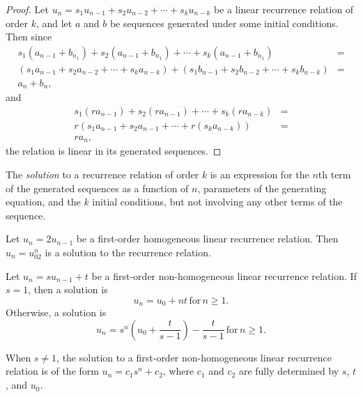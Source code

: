 \begin{proof}
    Let $u_n = s_1u_{n-1} + s_2u_{n-2} + \cdots + s_ku_{n-k}$ be a linear recurrence relation of order $k$, and let $a$ and $b$ be sequences generated under some initial conditions. Then since
    \begin{align*}
        s_1(a_{n-1} + b_{n_1}) + s_2(a_{n-1} + b_{n_1}) + \cdots + s_k(a_{n-1} + b_{n_1}) & = \\ (s_1a_{n-1} + s_2a_{n-2} + \cdots + s_ka_{n-k}) + (s_1b_{n-1} + s_2b_{n-2} + \cdots + s_kb_{n-k}) & = \\
        a_n + b_n, &
    \end{align*}
    and
    \begin{align*}
        s_1(ra_{n-1}) + s_2(ra_{n-1}) + \cdots + s_k(ra_{n-k}) & = \\
        r(s_1a_{n-1} + s_2a_{n-1} + \cdots + r(s_ka_{n-k})) & = \\
        ra_n, &
    \end{align*}
    the relation is linear in its generated sequences.
\end{proof}

\begin{defn}
    The \emph{solution} to a recurrence relation of order $k$ is an expression for the $n$th term of the generated sequences as a function of $n$, parameters of the generating equation, and the $k$ initial conditions, but not involving any other terms of the sequence.
\end{defn}

\begin{exmp}
    Let $u_n = 2u_{n-1}$ be a first-order homogeneous linear recurrence relation. Then $u_n = u_02^n$ is a solution to the recurrence relation.
\end{exmp}

\begin{thm}
    Let $u_n = su_{n-1} + t$ be a first-order non-homogeneous linear recurrence relation. If $s = 1$, then a solution is \[u_n = u_0 + nt \,\textrm{for}\, n \geq 1.\] Otherwise, a solution is \[u_n = s^n(u_0 + \frac{t}{s-1}) - \frac{t}{s-1} \,\textrm{for}\, n \geq 1.\]
\end{thm}

\begin{rmk}
    When $s \neq 1$, the solution to a first-order non-homogeneous linear recurrence relation is of the form $u_n = c_1s^n + c_2$, where $c_1$ and $c_2$ are fully determined by $s$, $t$, and $u_0$.
\end{rmk}


